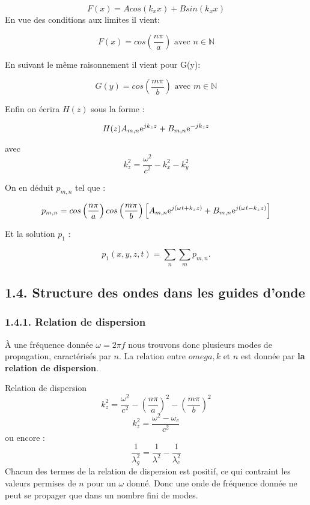 \documentclass[french, a4paper, 10pt, twocolumn, landscape]{article}
\begin{document}
\begin{equation}
	F(x) = Acos(k_x x) + Bsin(k_x x)
\end{equation}
En vue des conditions aux limites il vient:

\begin{equation}
	F(x) = cos\left(\frac{n\pi}{a}\right) \textrm{ avec } n\in\mathbb{N}
\end{equation}

En suivant le même raisonnement il vient pour G(y):

\begin{equation}
	G(y) = cos\left(\frac{m\pi}{b}\right) \textrm{ avec } m\in\mathbb{N}
\end{equation}

Enfin on écrira $H(z)$ sous la forme : 

\begin{equation}
	H(z) A_{m,n}{\rm e}^{jk_z z}+ B_{m,n}{\rm e}^{-jk_z z}
\end{equation}

avec \[k_z^2 = \frac{\omega^2}{c^2}-k_x^2 - k_y^2\]

On en déduit $p_{m,n}$ tel que : 


\begin{equation}
	p_{m,n} = cos\left(\frac{n\pi}{a}\right)cos\left(\frac{m\pi}{b}\right)\left[A_{m,n}{\rm e}^{j\left(\omega t+ k_z z\right)}+ B_{m,n}{\rm e}^{j\left(\omega t- k_z z\right)}\right]
\end{equation}

Et la solution $p_1$ : 

\begin{equation}
	p_1(x,y,z,t) = \sum_n\sum_m p_{m,n}.
\end{equation}

\subsection*{1.4. Structure des ondes dans les guides d'onde}
\subsubsection*{1.4.1. Relation de dispersion}

À une fréquence donnée $\omega = 2\pi f$ nous trouvons donc plusieurs modes de propagation, caractérisés par $n$. La relation entre $omega, k$ et $n$ est donnée par \textbf{la relation de dispersion}.

\begin{Resultat}{Relation de dispersion}
	\[k_z^2 = \frac{\omega^2}{c^2}-\left(\frac{n\pi}{a}\right)^2-\left(\frac{m\pi}{b}\right)^2\]
	\begin{equation}
		k_z^2 = \frac{\omega^2-\omega_c}{c^2}
	\end{equation}
	ou encore : 
	\begin{equation}
		\frac{1}{\lambda_g^2} = \frac{1}{\lambda^2}-\frac{1}{\lambda_c^2}
	\end{equation}
	Chacun des termes de la relation de dispersion est positif, ce qui contraint les valeurs permises de $n$ pour un $\omega$ donné. Donc une onde de fréquence donnée ne peut se propager que dans un nombre fini de modes.
\end{Resultat}
\end{document}
